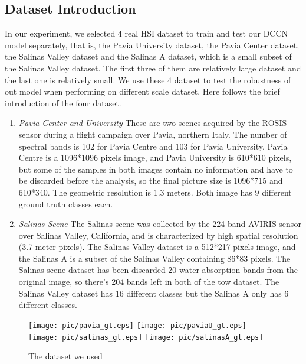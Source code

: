 \documentclass{article}
\begin{document}
	\subsection{Dataset Introduction}\label{subsec:dataset-introduction}
	In our experiment, we selected 4 real HSI dataset to train and test our DCCN model separately, that is, the
	Pavia University dataset, the Pavia Center dataset, the Salinas Valley dataset and the Salinas A dataset, which is
	a small subset of the Salinas Valley dataset.
	The first three of them are relatively large dataset and the last one is relatively small.
	We use these 4 dataset to test the robustness of out model when performing on different scale dataset.
	Here follows the brief introduction of the four dataset.
	\begin{enumerate}[1)]
		\item \textit{Pavia Center and University} These are two scenes acquired by the ROSIS sensor during a flight
		campaign over Pavia, northern Italy.
		The number of spectral bands is 102 for Pavia Centre and 103 for Pavia University.
		Pavia Centre is a 1096*1096 pixels image, and Pavia University is 610*610 pixels, but some of the samples in
		both images contain no information and have to be discarded before the analysis, so the final picture size is
		1096*715 and 610*340.
		The geometric resolution is 1.3 meters.
		Both image has 9 different ground truth classes each.
		\item \textit{Salinas Scene} The Salinas scene was collected by the 224-band AVIRIS sensor over Salinas Valley,
		California, and is characterized by high spatial resolution (3.7-meter pixels).
		The Salinas Valley dataset is a 512*217 pixels image, and the Salinas A is a subset of the Salinas Valley
		containing 86*83 pixels.
		The Salinas scene dataset has been discarded 20 water absorption bands from the original image, so there's 204
		bands left in both of the tow dataset.
		The Salinas Valley dataset has 16 different classes but the Salinas A only has 6 different classes.
	\end{enumerate}
	\begin{figure}[!ht]
		\centering
		\texttt{[image: pic/pavia\_gt.eps]}
		\texttt{[image: pic/paviaU\_gt.eps]}
		\texttt{[image: pic/salinas\_gt.eps]}
		\texttt{[image: pic/salinasA\_gt.eps]}
		\caption{The dataset we used}
		\label{gt}
	\end{figure}
\end{document}
